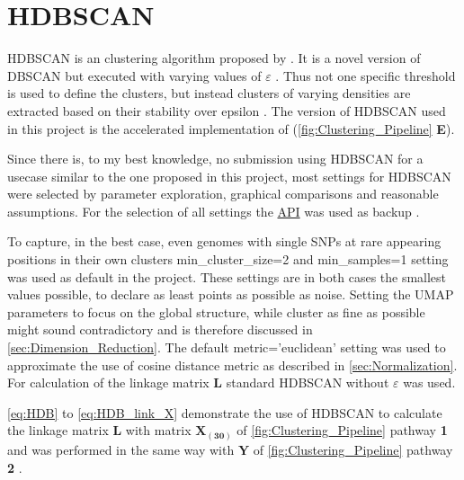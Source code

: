 \section{HDBSCAN} \label{sec:HDBSCAN}

\gls{HDBSCAN} is an clustering algorithm proposed by \textcite{campello_hierarchical_2015, hutchison_density-based_2013}. It is a novel version of \gls{DBSCAN} but executed with varying values of $\varepsilon$ \autocite{hutchison_density-based_2013}. Thus not one specific threshold is used to define the clusters, but instead clusters of varying densities are extracted based on their stability over epsilon \autocite{mcinnes_hdbscan_2017}. The version of \gls{HDBSCAN} used in this project is the accelerated implementation of \textcite{mcinnes_accelerated_2017} (\autoref{fig:Clustering_Pipeline} \textsf{\textbf{E}}).

Since there is, to my best knowledge, no submission using \gls{HDBSCAN} for a usecase similar to the one proposed in this project, most settings for \gls{HDBSCAN} were selected by parameter exploration, graphical comparisons and reasonable assumptions. For the selection of all settings the \href{https://hdbscan.readthedocs.io/en/latest/api.html}{API} was used as backup \autocite{mcinnes_hdbscan_2017}. 

To capture, in the best case, even genomes with single \glspl{SNP} at rare appearing positions in their own clusters \colorbox{backcolour}{min\_cluster\_size=2} and \colorbox{backcolour}{min\_samples=1} setting was used as default in the project. These settings are in both cases the smallest values possible, to declare as least points as possible as noise. Setting the \gls{UMAP} parameters to focus on the global structure, while cluster as fine as possible might sound contradictory and is therefore discussed in \autoref{sec:Dimension_Reduction}. The default \colorbox{backcolour}{metric='euclidean'} setting was used to approximate the use of cosine distance metric as described in \autoref{sec:Normalization}. For calculation of the linkage matrix $\mathbf{L}$ standard \gls{HDBSCAN} without $\varepsilon$ was used.

\autoref{eq:HDB} to \autoref{eq:HDB_link_X} demonstrate the use of \gls{HDBSCAN} to calculate the linkage matrix $\mathbf{L}$ with matrix $\mathbf{X_{(30)}}$ of \autoref{fig:Clustering_Pipeline} pathway \textsf{\textbf{1}} and was performed in the same way with $\mathbf{Y}$ of \autoref{fig:Clustering_Pipeline} pathway \textsf{\textbf{2}} \autocite{mcinnes_hdbscan_2017, gower_minimum_1969}.

